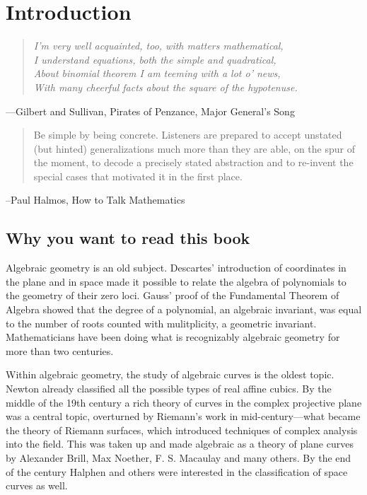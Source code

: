 

\setlength{\parskip}{5pt}

\addtocounter{chapter}{-1}
\chapter{Introduction}
\label{IntroChapter}

\begin{quote}\it{I'm very well acquainted, too, with matters mathematical,\\
I understand equations, both the simple and quadratical,\\
About binomial theorem I am teeming with a lot o' news,\\
With many cheerful facts about the square of the hypotenuse.}
\end{quote}

---Gilbert and Sullivan, Pirates of Penzance, Major General's Song


\begin{quote}
Be simple by being concrete. Listeners are prepared to
accept unstated (but hinted) generalizations much more than they are able, on the spur of the moment, to
decode a precisely stated abstraction and to re-invent the special cases that motivated it in the first place. 
\end{quote}

--Paul Halmos, How to Talk Mathematics
\section{Why you want to read this book}

Algebraic geometry is an old subject. Descartes' introduction of coordinates in the plane and in space made it possible to relate the algebra of polynomials to the geometry of their zero loci. Gauss' proof of the Fundamental Theorem of Algebra showed that the degree of a polynomial, an algebraic invariant, was equal to the number of roots counted with mulitplicity, a geometric invariant. Mathematicians have been doing what is recognizably algebraic geometry for more than two centuries.

Within algebraic geometry, the study of algebraic curves is the oldest topic. Newton already classified all the possible types of real affine cubics. By the middle of
the 19th century a rich theory of curves in the complex projective plane was a central topic, overturned by Riemann's work in mid-century---what became the theory of Riemann surfaces, which introduced techniques of complex analysis into the field. This was  taken up and made algebraic as a theory of plane curves by Alexander Brill, Max Noether, F. S. Macaulay and many others. By the end of the century Halphen and others were interested in the classification of space curves as well. 

